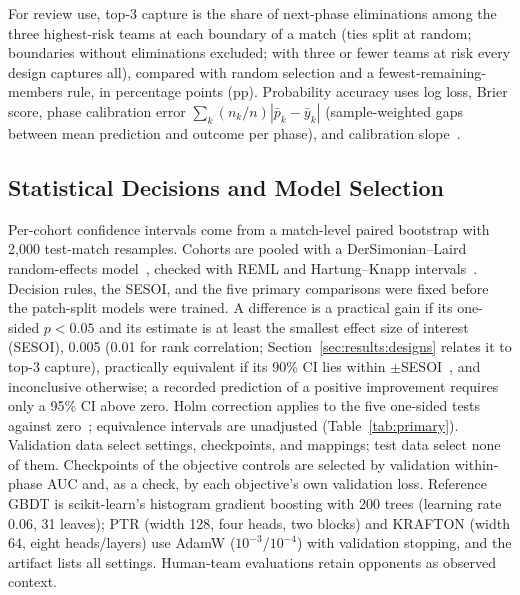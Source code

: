 \documentclass[sigconf,anonymous,nonacm]{acmart}
\begin{document}
For review use, top-3 capture is the share of next-phase eliminations among the three highest-risk teams at each boundary of a match (ties split at random; boundaries without eliminations excluded; with three or fewer teams at risk every design captures all), compared with random selection and a fewest-remaining-members rule, in percentage points (pp). Probability accuracy uses log loss, Brier score, phase calibration error $\sum_k(n_k/n)|\bar p_k-\bar y_k|$ (sample-weighted gaps between mean prediction and outcome per phase), and calibration slope~\cite{VanCalster16}.

\subsection{Statistical Decisions and Model Selection}
Per-cohort confidence intervals come from a match-level paired bootstrap with 2,000 test-match resamples.
Cohorts are pooled with a DerSimonian--Laird random-effects model~\cite{DerSimonian86}, checked with REML and Hartung--Knapp intervals~\cite{HartungKnapp01}.
Decision rules, the SESOI, and the five primary comparisons were fixed before the patch-split models were trained. A difference is a practical gain if its one-sided $p<0.05$ and its estimate is at least the smallest effect size of interest (SESOI), 0.005 (0.01 for rank correlation; Section~\ref{sec:results:designs} relates it to top-3 capture), practically equivalent if its 90\% CI lies within $\pm$SESOI~\cite{Schuirmann87}, and inconclusive otherwise; a recorded prediction of a positive improvement requires only a 95\% CI above zero.
Holm correction applies to the five one-sided tests against zero~\cite{Holm79}; equivalence intervals are unadjusted (Table~\ref{tab:primary}).
Validation data select settings, checkpoints, and mappings; test data select none of them. Checkpoints of the objective controls are selected by validation within-phase AUC and, as a check, by each objective's own validation loss. Reference GBDT is scikit-learn's histogram gradient boosting with 200 trees (learning rate 0.06, 31 leaves); PTR (width 128, four heads, two blocks) and KRAFTON (width 64, eight heads/layers) use AdamW ($10^{-3}$/$10^{-4}$) with validation stopping, and the artifact lists all settings. Human-team evaluations retain opponents as observed context.


\end{document}
